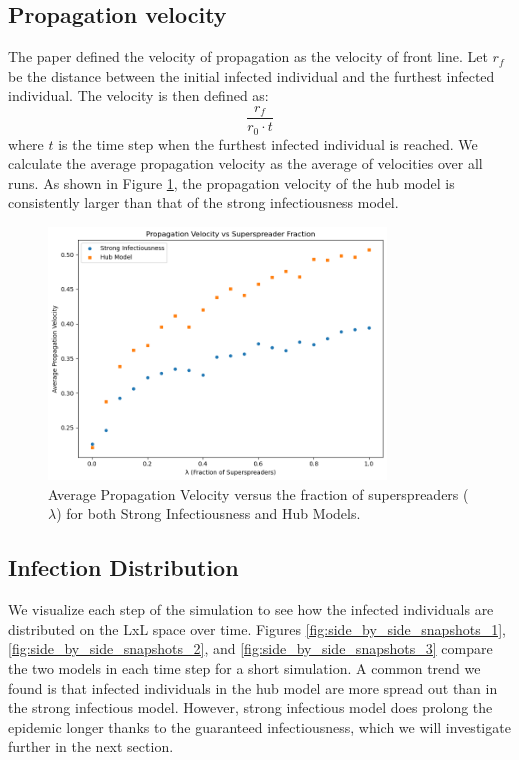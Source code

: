 \documentclass{article}
\begin{document}
\subsection{Propagation velocity}
\label{sec:results_propagation_velocity}
The paper defined the velocity of propagation as the velocity of front line. Let \(r_f\) be the distance between the initial infected individual and the furthest infected individual. The velocity is then defined as:
\[
\frac{r_f}{r_0 \cdot t}
\]
where \(t\) is the time step when the furthest infected individual is reached. We calculate the average propagation velocity as the average of velocities over all runs. As shown in Figure \ref{fig:propagation_speed}, the propagation velocity of the hub model is consistently larger than that of the strong infectiousness model. 
\begin{figure}[!htbp]
    \centering
    \includegraphics[width=0.8\textwidth]{fig/velocity.png} 
    \caption{Average Propagation Velocity versus the fraction of superspreaders (\(\lambda\)) for both Strong Infectiousness and Hub Models.}
    \label{fig:propagation_speed}
\end{figure}

\subsection{Infection Distribution}
\label{sec:results_infection_distribution}
We visualize each step of the simulation to see how the infected individuals are distributed on the LxL space over time. Figures \ref{fig:side_by_side_snapshots_1}, \ref{fig:side_by_side_snapshots_2}, and \ref{fig:side_by_side_snapshots_3} compare the two models in each time step for a short simulation. A common trend we found is that infected individuals in the hub model are more spread out than in the strong infectious model. However, strong infectious model does prolong the epidemic longer thanks to the guaranteed infectiousness, which we will investigate further in the next section.
\end{document}
